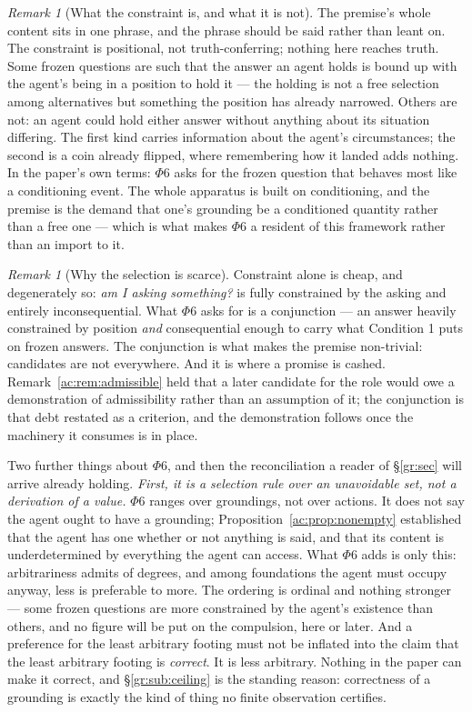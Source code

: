 \documentclass[11pt]{article}
\numberwithin{equation}{section}
\theoremstyle{plain}
\theoremstyle{definition}
\theoremstyle{remark}
\newtheorem{remark}[theorem]{Remark}
\begin{document}
\begin{remark}[What the constraint is, and what it is not]\label{ac:rem:constraint}
The premise's whole content sits in one phrase, and the phrase should be said rather than leant on. The constraint is positional, not truth-conferring; nothing here reaches truth. Some frozen questions are such that the answer an agent holds is bound up with the agent's being in a position to hold it --- the holding is not a free selection among alternatives but something the position has already narrowed. Others are not: an agent could hold either answer without anything about its situation differing. The first kind carries information about the agent's circumstances; the second is a coin already flipped, where remembering how it landed adds nothing. In the paper's own terms: $\Phi6$ asks for the frozen question that behaves most like a conditioning event. The whole apparatus is built on conditioning, and the premise is the demand that one's grounding be a conditioned quantity rather than a free one --- which is what makes $\Phi6$ a resident of this framework rather than an import to it.
\end{remark}

\begin{remark}[Why the selection is scarce]\label{ac:rem:scarce}
Constraint alone is cheap, and degenerately so: \emph{am I asking something?} is fully constrained by the asking and entirely inconsequential. What $\Phi6$ asks for is a conjunction --- an answer heavily constrained by position \emph{and} consequential enough to carry what Condition 1 puts on frozen answers. The conjunction is what makes the premise non-trivial: candidates are not everywhere. And it is where a promise is cashed. Remark~\ref{ac:rem:admissible} held that a later candidate for the role would owe a demonstration of admissibility rather than an assumption of it; the conjunction is that debt restated as a criterion, and the demonstration follows once the machinery it consumes is in place.
\end{remark}

Two further things about $\Phi6$, and then the reconciliation a reader of \S\ref{gr:sec} will arrive already holding. \emph{First, it is a selection rule over an unavoidable set, not a derivation of a value.} $\Phi6$ ranges over groundings, not over actions. It does not say the agent ought to have a grounding; Proposition~\ref{ac:prop:nonempty} established that the agent has one whether or not anything is said, and that its content is underdetermined by everything the agent can access. What $\Phi6$ adds is only this: arbitrariness admits of degrees, and among foundations the agent must occupy anyway, less is preferable to more. The ordering is ordinal and nothing stronger --- some frozen questions are more constrained by the agent's existence than others, and no figure will be put on the compulsion, here or later. And a preference for the least arbitrary footing must not be inflated into the claim that the least arbitrary footing is \emph{correct}. It is less arbitrary. Nothing in the paper can make it correct, and \S\ref{gr:sub:ceiling} is the standing reason: correctness of a grounding is exactly the kind of thing no finite observation certifies.
\end{document}

